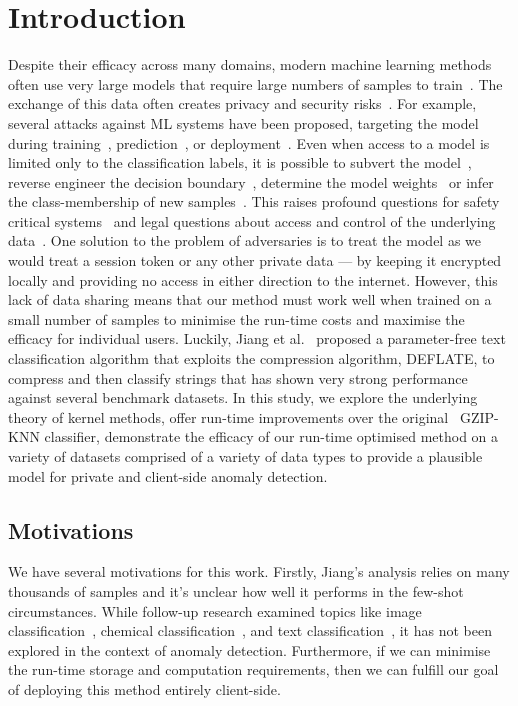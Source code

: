\documentclass[conference]{IEEEtran}
\begin{document}
\section{Introduction}

Despite their efficacy across many domains, modern machine learning methods often use very large models that require large numbers of samples to train~\cite{desislavov2021compute}. 
The exchange of this data often creates privacy and security risks~\cite{chakraborty_adversarial_2018,meyers}. For example, several attacks against ML systems have been proposed, targeting the model during training~\cite{biggio_poisoning_2013}, prediction~\cite{biggio_evasion_2013,deepfool,carlini_towards_2017}, or deployment~\cite{distributed_attacks,santos2021universal}. 
Even when access to a model is limited only to the classification labels, it is possible to subvert the model~\cite{hopskipjump}, reverse engineer the decision boundary~\cite{deepfool}, determine the model weights~\cite{jagielski2020high} or infer the class-membership of new samples~\cite{bentley2020quantifying}. 
This raises profound questions for safety critical systems~\cite{meyers} and legal questions about access and control of the underlying data~\cite{mitrou2018data,marks2023ai}. 
One solution to the problem of adversaries is to treat the model as we would treat a session token or any other private data --- by keeping it encrypted locally and providing no access in either direction to the internet. 
However, this lack of data sharing means that our method must work well when trained on a small number of samples to minimise the run-time costs and maximise the efficacy for individual users.  
Luckily, Jiang et al.~\cite{jiang2022less} proposed a parameter-free text classification algorithm that exploits the compression algorithm, DEFLATE, to compress and then classify strings that has shown very strong performance against several benchmark datasets. 
In this study, we explore the underlying theory of kernel methods, offer run-time improvements over the original~\cite{jiang2022less} GZIP-KNN classifier, demonstrate the efficacy of our run-time optimised method on a variety of datasets comprised of a variety of data types to provide a plausible model for private and client-side anomaly detection.  


\subsection{Motivations}
 We have several motivations for this work. Firstly, Jiang's analysis relies on many thousands of samples and it's unclear how well it performs in the few-shot circumstances. While follow-up research examined topics like image classification~\cite{opitz2023gzip}, chemical classification~\cite{weinreich2023parameter}, and text classification~\cite{nishida2011tweet}, it has not been explored in the context of anomaly detection. Furthermore, if we can minimise the run-time storage and computation requirements, then we can fulfill our goal of deploying this method entirely client-side.
\end{document}
